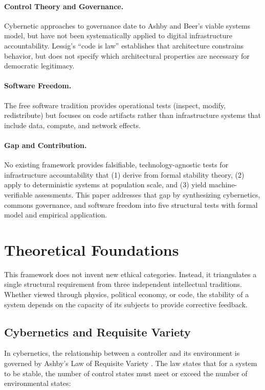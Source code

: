 \documentclass{article}
\begin{document}
\paragraph{Control Theory and Governance.} Cybernetic approaches to governance date to Ashby \citep{ashby1956} and Beer's viable systems model, but have not been systematically applied to digital infrastructure accountability. Lessig's ``code is law'' \citep{lessig2006} establishes that architecture constrains behavior, but does not specify which architectural properties are necessary for democratic legitimacy.

\paragraph{Software Freedom.} The free software tradition \citep{stallman2002} provides operational tests (inspect, modify, redistribute) but focuses on code artifacts rather than infrastructure systems that include data, compute, and network effects.

\paragraph{Gap and Contribution.} No existing framework provides falsifiable, technology-agnostic tests for infrastructure accountability that (1) derive from formal stability theory, (2) apply to deterministic systems at population scale, and (3) yield machine-verifiable assessments. This paper addresses that gap by synthesizing cybernetics, commons governance, and software freedom into five structural tests with formal model and empirical application.

\section{Theoretical Foundations}
\label{sec:theory}

This framework does not invent new ethical categories. Instead, it triangulates a single structural requirement from three independent intellectual traditions. Whether viewed through physics, political economy, or code, the stability of a system depends on the capacity of its subjects to provide corrective feedback.

\subsection{Cybernetics and Requisite Variety}

In cybernetics, the relationship between a controller and its environment is governed by Ashby's Law of Requisite Variety \citep{ashby1956}. The law states that for a system to be stable, the number of control states must meet or exceed the number of environmental states:
\end{document}

